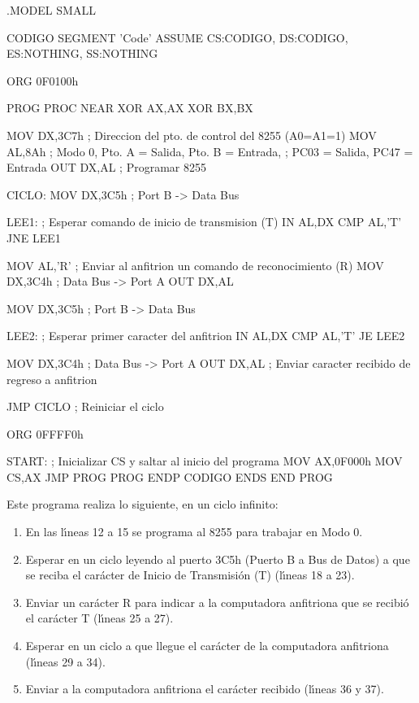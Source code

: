 \begin{listing}{1}
.MODEL SMALL

CODIGO SEGMENT 'Code'
   ASSUME CS:CODIGO, DS:CODIGO, ES:NOTHING, SS:NOTHING

   ORG 0F0100h

PROG PROC NEAR
   XOR AX,AX
   XOR BX,BX

   MOV DX,3C7h  ; Direccion del pto. de control del 8255 (A0=A1=1)
   MOV AL,8Ah   ; Modo 0, Pto. A = Salida, Pto. B = Entrada, 
                ; PC03 = Salida, PC47 = Entrada
   OUT DX,AL    ; Programar 8255

 CICLO:
   MOV DX,3C5h  ; Port B -> Data Bus

 LEE1:          ; Esperar comando de inicio de transmision (T)
   IN  AL,DX 
   CMP AL,'T'
   JNE LEE1

   MOV AL,'R'   ; Enviar al anfitrion un comando de reconocimiento (R)
   MOV DX,3C4h  ; Data Bus -> Port A
   OUT DX,AL

   MOV DX,3C5h  ; Port B -> Data Bus

 LEE2:          ; Esperar primer caracter del anfitrion
   IN  AL,DX
   CMP AL,'T'
   JE LEE2

   MOV DX,3C4h  ; Data Bus -> Port A
   OUT DX,AL    ; Enviar caracter recibido de regreso a anfitrion

   JMP CICLO    ; Reiniciar el ciclo

   ORG 0FFFF0h

 START:         ; Inicializar CS y saltar al inicio del programa
   MOV AX,0F000h
   MOV CS,AX
   JMP PROG
PROG ENDP
CODIGO ENDS
   END PROG
\end{listing}

Este programa realiza lo siguiente, en un ciclo infinito:

\begin{enumerate}
\item En las l\'{\i}neas 12 a 15 se programa al 8255 para trabajar en Modo 0.
\item Esperar en un ciclo leyendo al puerto 3C5h (Puerto B a Bus de Datos) a que se reciba el %
car\'acter de Inicio de Transmisi\'on (T) (l\'{\i}neas 18 a 23).
\item Enviar un car\'acter R para indicar a la computadora anfitriona que se recibi\'o el %
car\'acter T (l\'{\i}neas 25 a 27).
\item Esperar en un ciclo a que llegue el car\'acter de la computadora anfitriona %
(l\'{\i}neas 29 a 34).
\item Enviar a la computadora anfitriona el car\'acter recibido (l\'{\i}neas 36 y 37).
\end{enumerate}

